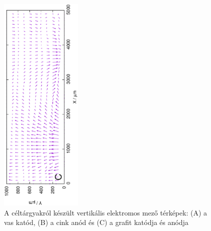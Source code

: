 \begin{figure}
\includegraphics[width=0.35\textwidth, angle=-90]{img/mérések/grafit1_v.eps}

\caption{A céltárgyakról készült vertikális elektromos mező térképek:
(A) a vas katód, (B) a cink anód és (C) a grafit katódja és anódja}
\label{fig:field_v}
\end{figure}


